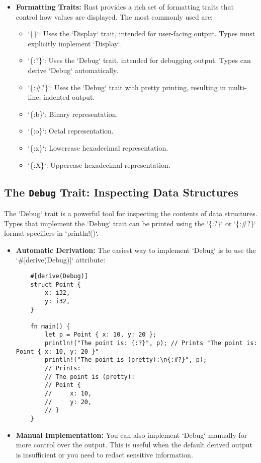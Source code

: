 \documentclass{article}
\begin{document}
{{{{\begin{itemize}
    \item \textbf{Formatting Traits:} Rust provides a rich set of formatting traits that control how values are displayed. The most commonly used are:
        \begin{itemize}
            \item `\{\}`: Uses the `Display` trait, intended for user-facing output.  Types must explicitly implement `Display`.
            \item `\{:?\}`: Uses the `Debug` trait, intended for debugging output.  Types can derive `Debug` automatically.
            \item `\{:#?\}`: Uses the `Debug` trait with pretty printing, resulting in multi-line, indented output.
            \item `\{:b\}`: Binary representation.
            \item `\{:o\}`: Octal representation.
            \item `\{:x\}`: Lowercase hexadecimal representation.
            \item `\{:X\}`: Uppercase hexadecimal representation.
        \end{itemize}
\end{itemize}

\subsection*{The \texttt{Debug} Trait: Inspecting Data Structures}

The `Debug` trait is a powerful tool for inspecting the contents of data structures. Types that implement the `Debug` trait can be printed using the `\{:?\}` or `\{:#?\}` format specifiers in `println!()`.

\begin{itemize}
    \item \textbf{Automatic Derivation:}  The easiest way to implement `Debug` is to use the `#[derive(Debug)]` attribute:
    \begin{verbatim}
    #[derive(Debug)]
    struct Point {
        x: i32,
        y: i32,
    }

    fn main() {
        let p = Point { x: 10, y: 20 };
        println!("The point is: {:?}", p); // Prints "The point is: Point { x: 10, y: 20 }"
        println!("The point is (pretty):\n{:#?}", p);
        // Prints:
        // The point is (pretty):
        // Point {
        //     x: 10,
        //     y: 20,
        // }
    }
    \end{verbatim}
    \item \textbf{Manual Implementation:} You can also implement `Debug` manually for more control over the output. This is useful when the default derived output is insufficient or you need to redact sensitive information.
\end{itemize}

}}}}
\end{document}
